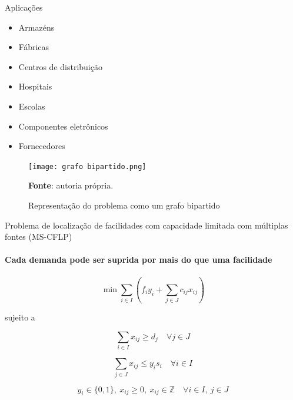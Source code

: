 \documentclass[aspectratio=169]{beamer}
\begin{document}
	\begin{frame}{Aplicações}
	
		\begin{multicols}{2}
			\begin{itemize}
				\item Armazéns
				\item Fábricas
				\item Centros de distribuição
				\item Hospitais
				\item Escolas
				\item Componentes eletrônicos
				\item Fornecedores 
			\end{itemize}	
		\end{multicols}
		
		\cite{Arenales,Krarup,Klose}

		\begin{figure}[H]
			\begin{center}
				\caption{Representação do problema como um grafo bipartido}
				
				\texttt{[image: grafo bipartido.png]}				
				\label{ilustr:bigrafo}
				
				\textbf{Fonte}: autoria própria.
			\end{center}
		\end{figure}
		
		
	\end{frame}


	\begin{frame}{Problema de localização de facilidades com capacidade limitada com múltiplas fontes (MS-CFLP)}
		\framesubtitle{Cada demanda pode ser suprida por mais do que uma facilidade}
		
		 
		
		
		
		
		\begin{equation}
			\label{ms:obj}		
			\min \sum_{i \in I} 
			(
			f_i y_i + \sum_{j \in J} c_{ij} x_{ij}
			)
		\end{equation}
		
		sujeito a 				
		
		\begin{equation}
			\label{ms:const:demand}		
			\sum_{i \in I} x_{ij} \ge d_j 
			\quad
			\forall j \in J
		\end{equation}
	
		\begin{equation}
			\label{ms:const:capacity}		
			\sum_{j \in J} x_{ij} \le y_i s_i 
			\quad
			\forall i \in I
		\end{equation}

		\begin{equation}
			\label{ms:dom:var}		
			y_i \in \{0, 1\}, 
			\ x_{ij} \ge 0, 
			\ x_{ij} \in \mathbb{Z}
			\quad
			\forall i \in I, \ j \in J
		\end{equation}
		
	\end{frame}	
\end{document}
